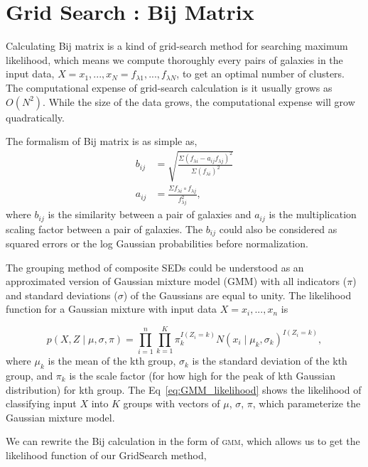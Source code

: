 \documentclass[12pt,letterpaper]{article}
\begin{document}
\section*{Grid Search : Bij Matrix}

Calculating Bij matrix is a kind of grid-search method 
for searching maximum likelihood, which means we compute thoroughly every pairs of galaxies in the
input data, $X = x_1, ..., x_N = f_{\lambda 1}, ..., f_{\lambda N}$, to get an optimal number of clusters.
The computational expense of grid-search calculation is it usually grows as $O(N^2)$.
While the size of the data grows, the computational expense will grow quadratically.

The formalism of Bij matrix is as simple as,
\begin{equation}
    \begin{split}
        b_{ij} &= \sqrt{ \frac{\Sigma ( f_{\lambda i} - a_{ij} f_{\lambda j} )^2}{\Sigma (f_{\lambda i})^2} }\\
        a_{ij} &= \frac{\Sigma f_{\lambda i} \circ f_{\lambda j} }{f_{\lambda j}^2},
    \end{split}
\end{equation}
where $b_{ij}$ is the similarity between a pair of galaxies and $a_{ij}$ is the multiplication scaling factor between a pair of galaxies.
The $b_{ij}$ could also be considered as squared errors or the log Gaussian probabilities before normalization.

The grouping method of composite SEDs could be understood as an approximated version of Gaussian mixture model (\textsc{GMM})
with all indicators ($\pi$) and standard deviations ($\sigma$) of the Gaussians are equal to unity.
The likelihood function for a Gaussian mixture with 
input data $X = x_i, ..., x_n$ is

\begin{equation}
    p(X, Z \mid \mu, \sigma, \pi) 
    = \prod_{i=1}^{n} \prod_{k=1}^{K} 
    \pi_k^{I(Z_i = k)} N(x_i \mid \mu_k, \sigma_k)^{I(Z_i = k)},
    \label{eq:GMM_likelihood}
\end{equation}
where $\mu_k$ is the mean of the kth group, 
$\sigma_k$ is the standard deviation of the kth group,
and $\pi_k$ is the scale factor 
(for how high for the peak of kth Gaussian distribution)
for kth group.
The Eq~\ref{eq:GMM_likelihood} shows the likelihood of 
classifying input $X$ into $K$ groups with vectors of $\mu$, $\sigma$, $\pi$, 
which parameterize the Gaussian mixture model.

We can rewrite the Bij calculation in the form of \textsc{gmm},
which allows us to get the likelihood function of our GridSearch method,
\end{document}

